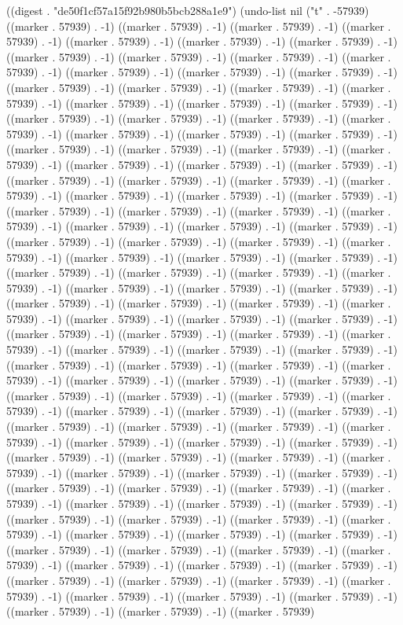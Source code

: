 
((digest . "de50f1cf57a15f92b980b5bcb288a1e9") (undo-list nil ("t" . -57939) ((marker . 57939) . -1) ((marker . 57939) . -1) ((marker . 57939) . -1) ((marker . 57939) . -1) ((marker . 57939) . -1) ((marker . 57939) . -1) ((marker . 57939) . -1) ((marker . 57939) . -1) ((marker . 57939) . -1) ((marker . 57939) . -1) ((marker . 57939) . -1) ((marker . 57939) . -1) ((marker . 57939) . -1) ((marker . 57939) . -1) ((marker . 57939) . -1) ((marker . 57939) . -1) ((marker . 57939) . -1) ((marker . 57939) . -1) ((marker . 57939) . -1) ((marker . 57939) . -1) ((marker . 57939) . -1) ((marker . 57939) . -1) ((marker . 57939) . -1) ((marker . 57939) . -1) ((marker . 57939) . -1) ((marker . 57939) . -1) ((marker . 57939) . -1) ((marker . 57939) . -1) ((marker . 57939) . -1) ((marker . 57939) . -1) ((marker . 57939) . -1) ((marker . 57939) . -1) ((marker . 57939) . -1) ((marker . 57939) . -1) ((marker . 57939) . -1) ((marker . 57939) . -1) ((marker . 57939) . -1) ((marker . 57939) . -1) ((marker . 57939) . -1) ((marker . 57939) . -1) ((marker . 57939) . -1) ((marker . 57939) . -1) ((marker . 57939) . -1) ((marker . 57939) . -1) ((marker . 57939) . -1) ((marker . 57939) . -1) ((marker . 57939) . -1) ((marker . 57939) . -1) ((marker . 57939) . -1) ((marker . 57939) . -1) ((marker . 57939) . -1) ((marker . 57939) . -1) ((marker . 57939) . -1) ((marker . 57939) . -1) ((marker . 57939) . -1) ((marker . 57939) . -1) ((marker . 57939) . -1) ((marker . 57939) . -1) ((marker . 57939) . -1) ((marker . 57939) . -1) ((marker . 57939) . -1) ((marker . 57939) . -1) ((marker . 57939) . -1) ((marker . 57939) . -1) ((marker . 57939) . -1) ((marker . 57939) . -1) ((marker . 57939) . -1) ((marker . 57939) . -1) ((marker . 57939) . -1) ((marker . 57939) . -1) ((marker . 57939) . -1) ((marker . 57939) . -1) ((marker . 57939) . -1) ((marker . 57939) . -1) ((marker . 57939) . -1) ((marker . 57939) . -1) ((marker . 57939) . -1) ((marker . 57939) . -1) ((marker . 57939) . -1) ((marker . 57939) . -1) ((marker . 57939) . -1) ((marker . 57939) . -1) ((marker . 57939) . -1) ((marker . 57939) . -1) ((marker . 57939) . -1) ((marker . 57939) . -1) ((marker . 57939) . -1) ((marker . 57939) . -1) ((marker . 57939) . -1) ((marker . 57939) . -1) ((marker . 57939) . -1) ((marker . 57939) . -1) ((marker . 57939) . -1) ((marker . 57939) . -1) ((marker . 57939) . -1) ((marker . 57939) . -1) ((marker . 57939) . -1) ((marker . 57939) . -1) ((marker . 57939) . -1) ((marker . 57939) . -1) ((marker . 57939) . -1) ((marker . 57939) . -1) ((marker . 57939) . -1) ((marker . 57939) . -1) ((marker . 57939) . -1) ((marker . 57939) . -1) ((marker . 57939) . -1) ((marker . 57939) . -1) ((marker . 57939) . -1) ((marker . 57939) . -1) ((marker . 57939) . -1) ((marker . 57939) . -1) ((marker . 57939) . -1) ((marker . 57939) . -1) ((marker . 57939) . -1) ((marker . 57939) . -1) ((marker . 57939) . -1) ((marker . 57939) . -1) ((marker . 57939) . -1) ((marker . 57939) . -1) ((marker . 57939) . -1) ((marker . 57939) . -1) ((marker . 57939) . -1) ((marker . 57939) . -1) ((marker . 57939) . -1) ((marker . 57939) . -1) ((marker . 57939) . -1) ((marker . 57939) . -1) ((marker . 57939) . -1) ((marker . 57939) . -1) ((marker . 57939) . -1) ((marker . 57939) . -1) ((marker . 57939) . -1) ((marker . 57939) . -1) ((marker . 57939) . -1) ((marker . 57939) 